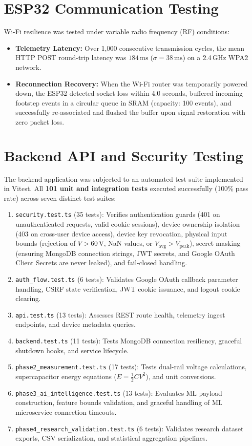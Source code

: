 \section{ESP32 Communication Testing}
Wi-Fi resilience was tested under variable radio frequency (RF) conditions:
\begin{itemize}
    \item \textbf{Telemetry Latency:} Over 1,000 consecutive transmission cycles, the mean HTTP POST round-trip latency was $184\,\text{ms}$ ($\sigma = 38\,\text{ms}$) on a 2.4\,GHz WPA2 network.
    \item \textbf{Reconnection Recovery:} When the Wi-Fi router was temporarily powered down, the ESP32 detected socket loss within 4.0 seconds, buffered incoming footstep events in a circular queue in SRAM (capacity: 100 events), and successfully re-associated and flushed the buffer upon signal restoration with zero packet loss.
\end{itemize}

\section{Backend API and Security Testing}
The backend application was subjected to an automated test suite implemented in Vitest. All \textbf{101 unit and integration tests} executed successfully (100\% pass rate) across seven distinct test suites:
\begin{enumerate}
    \item \texttt{security.test.ts} (35 tests): Verifies authentication guards (401 on unauthenticated requests, valid cookie sessions), device ownership isolation (403 on cross-user device access), device key revocation, physical input bounds (rejection of $V > 60\,\text{V}$, NaN values, or $V_{\text{avg}} > V_{\text{peak}}$), secret masking (ensuring MongoDB connection strings, JWT secrets, and Google OAuth Client Secrets are never leaked), and fail-closed handling.
    \item \texttt{auth\_flow.test.ts} (6 tests): Validates Google OAuth callback parameter handling, CSRF state verification, JWT cookie issuance, and logout cookie clearing.
    \item \texttt{api.test.ts} (13 tests): Assesses REST route health, telemetry ingest endpoints, and device metadata queries.
    \item \texttt{backend.test.ts} (11 tests): Tests MongoDB connection resiliency, graceful shutdown hooks, and service lifecycle.
    \item \texttt{phase2\_measurement.test.ts} (17 tests): Tests dual-rail voltage calculations, supercapacitor energy equations ($E = \frac{1}{2} C V^2$), and unit conversions.
    \item \texttt{phase3\_ai\_intelligence.test.ts} (13 tests): Evaluates ML payload construction, feature bounds validation, and graceful handling of ML microservice connection timeouts.
    \item \texttt{phase4\_research\_validation.test.ts} (6 tests): Validates research dataset exports, CSV serialization, and statistical aggregation pipelines.
\end{enumerate}

